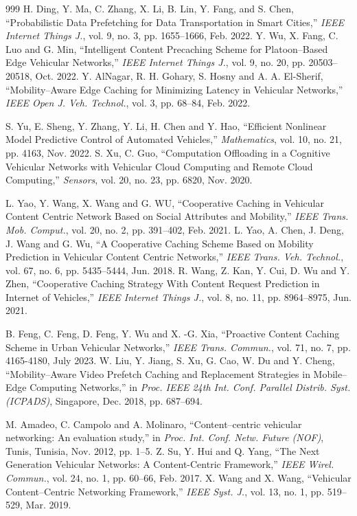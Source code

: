 \documentclass[journal]{IEEEtran}
\begin{document}
\begin{thebibliography}{999}
 H. Ding, Y. Ma, C. Zhang, X. Li, B. Lin, Y. Fang, and S. Chen, ``Probabilistic Data Prefetching for Data Transportation in Smart Cities,'' \emph{IEEE Internet Things J.}, vol. 9, no. 3, pp. 1655--1666, Feb. 2022.
 Y. Wu, X. Fang, C. Luo and G. Min, ``Intelligent Content Precaching Scheme for Platoon--Based Edge Vehicular Networks,'' \emph{IEEE Internet Things J.}, vol. 9, no. 20, pp. 20503--20518, Oct. 2022.
 Y. AlNagar, R. H. Gohary, S. Hosny and A. A. El-Sherif, ``Mobility--Aware Edge Caching for Minimizing Latency in Vehicular Networks,'' \emph{IEEE Open J. Veh. Technol.}, vol. 3, pp. 68--84, Feb. 2022.

 S. Yu, E. Sheng, Y. Zhang, Y. Li, H. Chen and Y. Hao, ``Efficient Nonlinear Model Predictive Control of Automated Vehicles,'' \emph{Mathematics}, vol. 10, no. 21, pp. 4163, Nov. 2022.
 S. Xu, C. Guo, ``Computation Offloading in a Cognitive Vehicular Networks with Vehicular Cloud Computing and Remote Cloud Computing,'' \emph{Sensors}, vol. 20, no. 23, pp. 6820, Nov. 2020.

 L. Yao, Y. Wang, X. Wang and G. WU,  ``Cooperative Caching in Vehicular Content Centric Network Based on Social Attributes and Mobility,'' \emph{IEEE Trans. Mob. Comput.},  vol. 20, no. 2, pp. 391--402, Feb. 2021.
 L. Yao, A. Chen, J. Deng, J. Wang and G. Wu,  ``A Cooperative Caching Scheme Based on Mobility Prediction in Vehicular Content Centric Networks,'' \emph{IEEE Trans. Veh. Technol.}, vol. 67, no. 6, pp. 5435--5444, Jun. 2018.
 R. Wang, Z. Kan, Y. Cui, D. Wu and Y. Zhen,  ``Cooperative Caching Strategy With Content Request Prediction in Internet of Vehicles,'' \emph{IEEE Internet Things J.}, vol. 8, no. 11, pp. 8964--8975, Jun. 2021.

B. Feng, C. Feng, D. Feng, Y. Wu and X. -G. Xia, ``Proactive Content Caching Scheme in Urban Vehicular Networks,'' \emph{IEEE Trans. Commun.}, vol. 71, no. 7, pp. 4165-4180, July 2023.
 W. Liu, Y. Jiang, S. Xu, G. Cao, W. Du and Y. Cheng, ``Mobility--Aware Video Prefetch Caching and Replacement Strategies in Mobile--Edge Computing Networks,'' in \emph{Proc. IEEE 24th Int. Conf. Parallel Distrib. Syst. (ICPADS)}, Singapore, Dec. 2018, pp. 687--694.

 M. Amadeo, C. Campolo and A. Molinaro, ``Content--centric vehicular networking: An evaluation study,'' in \emph{Proc. Int. Conf. Netw. Future (NOF)}, Tunis, Tunisia, Nov. 2012, pp. 1--5.
 Z. Su, Y. Hui and Q. Yang,  ``The Next Generation Vehicular Networks: A Content-Centric Framework,'' \emph{IEEE Wirel. Commun.}, vol. 24, no. 1, pp. 60--66, Feb. 2017.
X. Wang and X. Wang, ``Vehicular Content--Centric Networking Framework,'' \emph{IEEE Syst. J.}, vol. 13, no. 1, pp. 519--529, Mar. 2019.


\end{thebibliography}
\end{document}
